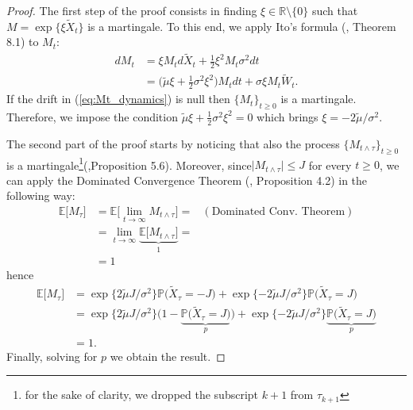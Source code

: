 \begin{proof}
	The first step of the proof consists in finding $\xi \in \mathbb{R}\setminus\{0\}$ such that $M=\exp\{\xi \widetilde{X}_t\}$ is a martingale. To this end, we apply Ito's formula (\cite{baldi2017}, Theorem 8.1) to $M_t$:
	\begin{align}\label{eq:Mt_dynamics}
	\nonumber
	dM_t & = \xi M_t d\widetilde{X}_t+\frac{1}{2}\xi^2M_t\sigma^2dt\\
	     & = \Big(\widetilde{\mu}\xi + \frac{1}{2}\sigma^2\xi^2\Big)M_t dt + \sigma\xi M_t \widetilde{W}_t.
	\end{align}
	If the drift in (\ref{eq:Mt_dynamics}) is null then $\{M_t\}_{t\geq0}$ is a martingale. Therefore, we impose the condition $\widetilde{\mu}\xi + \frac{1}{2}\sigma^2\xi^2 = 0$ which brings $ \xi = -2\widetilde{\mu}/\sigma^2$.
	
	The second part of the proof starts by noticing that also the process $\{M_{t\wedge\tau}\}_{t\geq 0}$ is a martingale\footnote{for the sake of clarity, we dropped the subscript $k+1$ from $\tau_{k+1}$}(\cite{baldi2017},Proposition 5.6). Moreover, since$\lvert M_{t\wedge\tau} \lvert \leq J$ for every $t\geq0$, we can apply the Dominated Convergence Theorem (\cite{baldi2017}, Proposition 4.2) in the following way:
	\begin{align*}
	\mathbb{E}\big[M_{\tau}\big] & = \mathbb{E}\Big[\lim\limits_{t\to\infty}M_{t\wedge\tau}\Big] = & (\text{Dominated Conv. Theorem})\\[2ex]
	& = \lim\limits_{t\to\infty}\underbrace{\mathbb{E}\big[M_{t\wedge\tau}\big]}_{1}=\\
	& = 1
	\end{align*}
	hence
	\begin{align*}
	\mathbb{E}\big[M_{\tau}\big] & = \exp\{2\widetilde{\mu}J/\sigma^2\}\mathbb{P}\Big(\widetilde{X}_{\tau}=-J\Big) + \exp\{-2\widetilde{\mu}J/\sigma^2\}\mathbb{P}\Big(\widetilde{X}_{\tau}=J\Big) \\[2ex]
	& = \exp\{2\widetilde{\mu}J/\sigma^2\}\bigg(1-\underbrace{\mathbb{P}\Big(\widetilde{X}_{\tau}=J\Big)}_{p}\bigg) + \exp\{-2\widetilde{\mu}J/\sigma^2\}\underbrace{\mathbb{P}\Big(\widetilde{X}_{\tau}=J\Big)}_{p} \\
	& = 1.
	\end{align*}
	Finally, solving for $p$ we obtain the result.
\end{proof}

